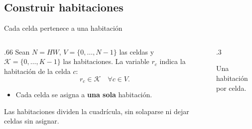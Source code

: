 \documentclass[aspectratio=169,11pt]{beamer}
\newcommand{\examplegrid}{%
  \draw[step=1,ink!35] (0,0) grid (4,4);
  \draw[ink,thick] (0,0) rectangle (4,4);
}
\begin{document}
\subsection{Construir habitaciones}

\begin{frame}{Cada celda pertenece a una habitaci\'on}
  \begin{columns}[T,onlytextwidth]
  \begin{column}{.66\textwidth}
  \small
  Sean \(N=HW\), \(V=\{0,\ldots,N-1\}\) las celdas y
  \(\mathcal K=\{0,\ldots,K-1\}\) las habitaciones.
  La variable \(r_c\) indica la habitaci\'on de la celda \(c\):
  \[
    r_c\in\mathcal K\quad\forall c\in V.
  \]
  \begin{itemize}
    \setlength{\itemsep}{3mm}
    \item Cada celda se asigna a \textbf{una sola} habitaci\'on.
  \end{itemize}
  \small Las habitaciones dividen la cuadr\'icula, sin solaparse
  ni dejar celdas sin asignar.
  \end{column}
  \begin{column}{.3\textwidth}
    \centering
    \par\smallskip\scriptsize Una habitaci\'on por celda.
  \end{column}
  \end{columns}
\end{frame}
\end{document}
